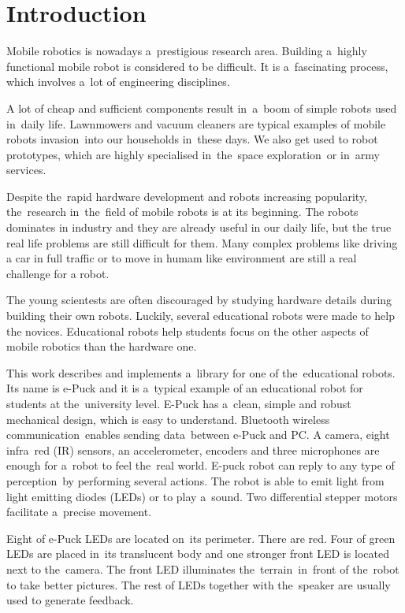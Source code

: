\chapter{Introduction}
\label{chap:intro}
  Mobile robotics is nowadays a~prestigious research area. Building a~highly functional 
  mobile robot is considered to be difficult. 
  It is a~fascinating process, which
  involves a~lot of engineering disciplines.
  
  A lot of cheap and sufficient components result in~a~boom of simple robots used in~daily life. 
  Lawnmowers and vacuum cleaners are typical examples of mobile robots invasion~into our households in~these days.
  We also get used to robot prototypes, which are highly specialised in~the~space exploration~or in~army services.

  Despite the~rapid hardware development and robots increasing popularity,
  the~research in~the~field of mobile robots is at its beginning.
  The robots dominates in industry and they are already useful in our daily
  life, but the true real life problems are still difficult for them.
  Many complex problems like driving a car in full traffic or to move in humam
  like environment are still a real challenge for a robot.
   
  The young scientests are often discouraged by
  studying hardware details during building their own robots.
  Luckily, several educational robots were made to help the novices.
  Educational robots help students focus on the other aspects of mobile robotics than the hardware one.
 
  This work describes and implements a~library for one of the~educational robots.
  Its name is e-Puck and it is a~typical example of an educational robot for students at the~university level. 
  E-Puck has a~clean, simple and robust mechanical design, which is easy to understand.
  Bluetooth wireless communication~enables sending data~between e-Puck and PC.
  A camera, eight infra~red (IR) sensors,	an accelerometer, encoders and three microphones 
  are enough for a~robot to feel the~real world.
  E-puck robot can reply to any type of perception~by performing several actions. 
  The robot is able to emit light from light emitting diodes (LEDs) or to play a~sound.
  Two differential stepper motors facilitate a~precise movement. 
  
  Eight of e-Puck LEDs are located on~its perimeter. There are red. 
  Four of green LEDs are placed in~its translucent body and
  one stronger front LED is located next to the~camera. 
  The front LED illuminates the~terrain~in~front of the~robot to
  take better pictures. The rest of LEDs together with the~speaker are usually used to
  generate feedback. 
  
